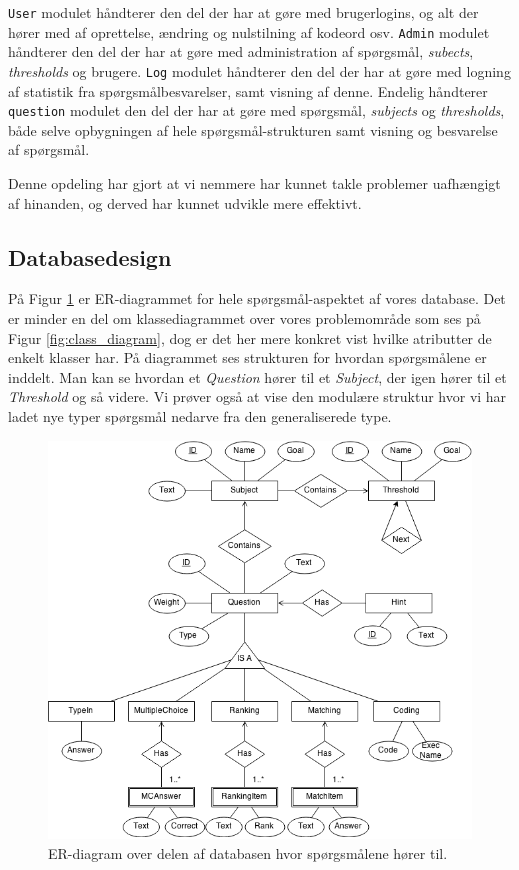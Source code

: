 \documentclass[11pt, a4paper]{article}
\begin{document}
\texttt{User} modulet håndterer den del der har at gøre med brugerlogins, og alt der hører med af oprettelse, ændring og nulstilning af kodeord osv. \texttt{Admin} modulet håndterer den del der har at gøre med administration af spørgsmål, \emph{subects}, \emph{thresholds} og brugere. \texttt{Log} modulet håndterer den del der har at gøre med logning af statistik fra spørgsmålbesvarelser, samt visning af denne. Endelig håndterer \texttt{question} modulet den del der har at gøre med spørgsmål, \emph{subjects} og \emph{thresholds}, både selve opbygningen af hele spørgsmål-strukturen samt visning og besvarelse af spørgsmål.

Denne opdeling har gjort at vi nemmere har kunnet takle problemer uafhængigt af hinanden, og derved har kunnet udvikle mere effektivt.

\subsection{Databasedesign}
\label{sub:databasedesign}
På Figur \ref{fig:er_diagram_question} er ER-diagrammet for hele spørgsmål-aspektet af vores database. Det er minder en del om klassediagrammet over vores problemområde som ses på Figur \ref{fig:class_diagram}, dog er det her mere konkret vist hvilke atributter de enkelt klasser har. På diagrammet ses strukturen for hvordan spørgsmålene er inddelt. Man kan se hvordan et \emph{Question} hører til et \emph{Subject}, der igen hører til et \emph{Threshold} og så videre. Vi prøver også at vise den modulære struktur hvor vi har ladet nye typer spørgsmål nedarve fra den generaliserede type.

\begin{figure}[h]
    \centering
    \includegraphics[width=1\linewidth]{figures/er_diagram/Qdb.png}
    \caption{ER-diagram over delen af databasen hvor spørgsmålene hører til.}
    \label{fig:er_diagram_question}
\end{figure}
\end{document}
